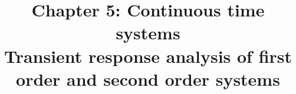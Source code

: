 \title{Chapter 5: Continuous time systems
\\Transient response analysis of first order and second order systems}
